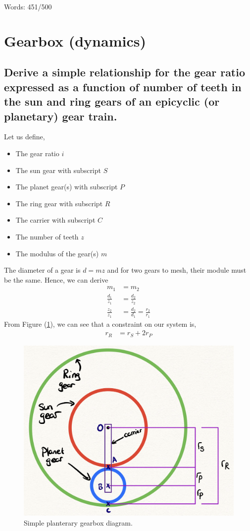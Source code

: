 \documentclass[12pt]{article}
\numberwithin{equation}{section}
\begin{document}
\begin{flushleft}
Words: 451/500

\section{Gearbox (dynamics)}
\subsection[Gear ratio derivation.]{Derive a simple relationship for the gear ratio expressed as a function of number of teeth in the sun and ring gears of an epicyclic (or planetary) gear train.}
Let us define,
\begin{multicols}{2}
  \begin{itemize} 
    \item The gear ratio $i$
    \item The sun gear with subscript $S$
    \item The planet gear(s) with subscript $P$ 
    \item The ring gear with subscript $R$
    \item The carrier with subscript $C$
    \item The number of teeth $z$
    \item The modulus of the gear(s) $m$
  \end{itemize}
\end{multicols}
The diameter of a gear is $d = mz$ and for two gears to mesh, their module must be the same. Hence, we can derive
\begin{align}
  m_1 &= m_2\\
  \frac{d_1}{z_1} &= \frac{d_2}{z_2}\\
  \frac{z_2}{z_1} &= \frac{d_2}{d_1} = \frac{r_2}{r_1}
\end{align}
From Figure (\ref{SystemRadii}), we can see that a constraint on our system is,
\begin{align}
  r_R &= r_S + 2r_P
  \label{radiiRelationship}
\end{align}

\begin{figure}[H]
  \centering
  \includegraphics[width = 0.7 \textwidth]{./img/GearRadii.png}
  \caption{Simple planterary gearbox diagram.}
  \label{SystemRadii}
\end{figure}


\end{flushleft}
\end{document}
